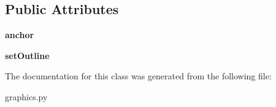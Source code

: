 \subsection*{Public Attributes}
\begin{DoxyCompactItemize}
\item 
{\bfseries anchor}\hypertarget{classgraphics_1_1_text_a24a6cb5416b56cc809da0a358de69db7}{}\label{classgraphics_1_1_text_a24a6cb5416b56cc809da0a358de69db7}

\item 
{\bfseries set\+Outline}\hypertarget{classgraphics_1_1_text_a9b7d6fa2325a028c73778227d8f9ac99}{}\label{classgraphics_1_1_text_a9b7d6fa2325a028c73778227d8f9ac99}

\end{DoxyCompactItemize}


The documentation for this class was generated from the following file\+:\begin{DoxyCompactItemize}
\item 
graphics.\+py\end{DoxyCompactItemize}
